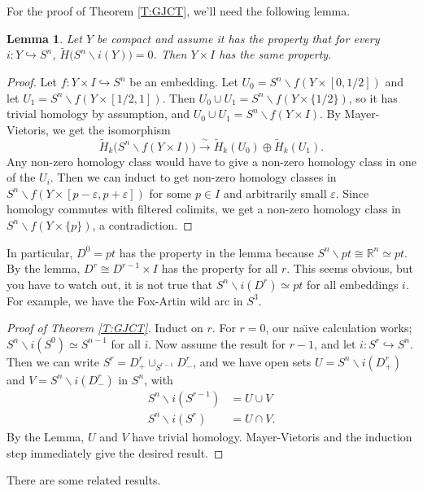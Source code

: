 \documentclass[12pt]{article}
\theoremstyle{plain}
\newtheorem{lemma}[equation]{Lemma}
\theoremstyle{definition}
\theoremstyle{remark}
\renewcommand{\H}{\widetilde H}
\newcommand{\RR}{\ensuremath{\mathbb{R}}}
\begin{document}
 For the proof of Theorem \ref{T:GJCT}, we'll need the following lemma.
 \begin{lemma}
   Let $Y$ be compact and assume it has the property that for every $i:Y\hookrightarrow
   S^n$, $\H\bigl(S^n\smallsetminus i(Y)\bigr)=0$. Then $Y\times I$ has the same
   property.
 \end{lemma}
 \begin{proof}
   Let $f:Y\times I\hookrightarrow S^n$ be an embedding. Let $U_0=S^n\smallsetminus
   f(Y\times [0,1/2])$ and let $U_1=S^n\smallsetminus f(Y\times [1/2,1])$. Then $U_0\cup
   U_1 = S^n \smallsetminus f(Y\times \{1/2\})$, so it has trivial homology by
   assumption, and $U_0\cup U_1 = S^n\smallsetminus f(Y\times I)$. By Mayer-Vietoris, we
   get the isomorphism
   \[
    \H_k\bigl(S^n\smallsetminus f(Y\times I)\bigr) \xrightarrow{\ \sim\ } \H_k(U_0)\oplus
    \H_k(U_1).
   \]
   Any non-zero homology class would have to give a non-zero homology class in one of the
   $U_i$. Then we can induct to get non-zero homology classes in $S^n\smallsetminus
   f(Y\times [p-\varepsilon,p+\varepsilon])$ for some $p\in I$ and arbitrarily small
   $\varepsilon$. Since homology commutes with filtered colimits, we get a non-zero
   homology class in $S^n\smallsetminus f(Y\times\{p\})$, a contradiction.
 \end{proof}
 In particular, $D^0=pt$ has the property in the lemma because $S^n\smallsetminus pt\cong
 \RR^n\simeq pt$. By the lemma, $D^r\cong D^{r-1}\times I$ has the property for all $r$.
 This seems obvious, but you have to watch out, it is not true that $S^n\smallsetminus
 i(D^r)\simeq pt$ for all embeddings $i$. For example, we have the Fox-Artin wild arc in
 $S^3$.
 \begin{proof}[Proof of Theorem \ref{T:GJCT}]
   Induct on $r$. For $r=0$, our na\"\i ve calculation works; $S^n\smallsetminus
   i(S^0)\simeq S^{n-1}$ for all $i$. Now assume the result for $r-1$, and let
   $i:S^r\hookrightarrow S^n$. Then we can write $S^r = D^r_+\cup_{S^{r-1}} D^r_-$, and
   we have open sets $U= S^n\smallsetminus i(D^r_+)$ and $V=S^n\smallsetminus i(D^r_-)$
   in $S^n$, with
   \begin{align*}
     S^n\smallsetminus i(S^{r-1}) &= U\cup V\\
     S^n\smallsetminus i(S^r) &= U\cap V.
   \end{align*}
   By the Lemma, $U$ and $V$ have trivial homology. Mayer-Vietoris and the induction step
   immediately give the desired result.
 \end{proof}
 There are some related results.
\end{document}
